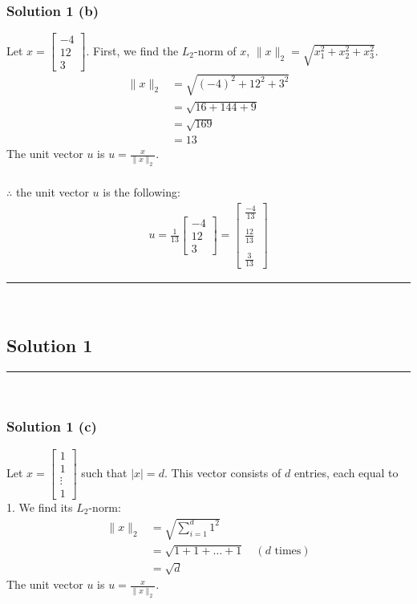 \documentclass{article}
\begin{document}
\subsubsection*{Solution 1 (b)}

Let $x = \begin{bmatrix}-4 \\ 12 \\ 3\end{bmatrix}$.
First, we find the $L_2$-norm of $x$, $\|x\|_2 = \sqrt{x_1^2 + x_2^2 + x_3^2}$.
\begin{align*}
    \|x\|_2 &= \sqrt{(-4)^2 + 12^2 + 3^2} \\
            &= \sqrt{16 + 144 + 9} \\
            &= \sqrt{169} \\
            &= 13
\end{align*}
The unit vector $u$ is $u = \frac{x}{\|x\|_2}$.

\subsubsection*{\normalfont}{$\therefore$ the unit vector $u$ is the following:}
\begin{align*}
    u = \frac{1}{13} \begin{bmatrix}-4 \\ 12 \\ 3\end{bmatrix} = \begin{bmatrix} \frac{-4}{13}  \\\\ \frac{12}{13} \\\\ \frac{3}{13} \end{bmatrix}
\end{align*}

\noindent\rule{\textwidth}{0.4pt}\\

\newpage

\subsection*{Solution 1}
\noindent\rule{\textwidth}{0.4pt}\\
\subsubsection*{Solution 1 (c)}
Let $x = \begin{bmatrix}1 \\ 1 \\ \vdots \\ 1\end{bmatrix}$ such that $|x| = d$.
This vector consists of $d$ entries, each equal to 1. We find its $L_2$-norm:
\begin{align*}
    \|x\|_2 &= \sqrt{\sum_{i=1}^{d} 1^2} \\
            &= \sqrt{1 + 1 + \dots + 1} \quad (d \text{ times}) \\
            &= \sqrt{d}
\end{align*}
The unit vector $u$ is $u = \frac{x}{\|x\|_2}$.
\end{document}
